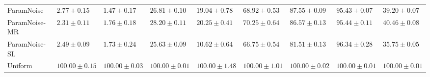 \documentclass{article} \usepackage{iclr2018_conference,times}
\begin{document}
\begin{landscape}
\begin{table}[ht]
\begin{adjustbox}{center}
\begin{tabular}{lllllllll}
ParamNoise & $2.77 \pm 0.15$& $1.47 \pm 0.17$& $26.81 \pm 0.10$& $19.04 \pm 0.78$& $68.92 \pm 0.53$& $87.55 \pm 0.09$& $95.43 \pm 0.07$& $39.20 \pm 0.07$ \\
ParamNoise-MR & $2.31 \pm 0.11$& $1.76 \pm 0.18$& $28.20 \pm 0.11$& $20.25 \pm 0.41$& $70.25 \pm 0.64$& $86.57 \pm 0.13$& $95.44 \pm 0.11$& $40.46 \pm 0.08$ \\
ParamNoise-SL & $2.49 \pm 0.09$& $1.73 \pm 0.24$& $25.63 \pm 0.09$& $10.62 \pm 0.64$& $66.75 \pm 0.54$& $81.51 \pm 0.13$& $96.34 \pm 0.28$& $35.75 \pm 0.05$ \\
Uniform & $100.00 \pm 0.15$& $100.00 \pm 0.03$& $100.00 \pm 0.01$& $100.00 \pm 1.48$& $100.00 \pm 1.01$& $100.00 \pm 0.02$& $100.00 \pm 0.01$& $100.00 \pm 0.01$ \\
\bottomrule
\end{tabular}
 	\end{adjustbox}
	\vspace*{\fill}
\end{table}
\end{landscape}
\end{document}
